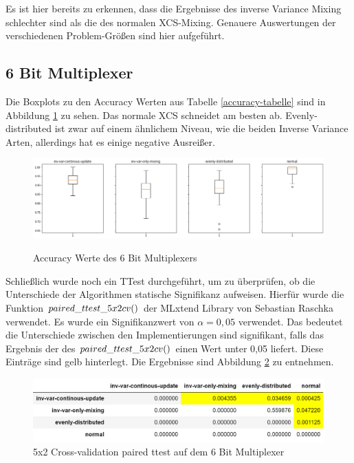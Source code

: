 \documentclass[10pt]{ocsmnar}
\begin{document}
Es ist hier bereits zu erkennen, dass die Ergebnisse des inverse Variance Mixing schlechter sind als die des normalen XCS-Mixing. 
Genauere Auswertungen der verschiedenen Problem-Größen sind hier aufgeführt. 

\subsection{6 Bit Multiplexer}
Die Boxplots zu den Accuracy Werten aus Tabelle \ref{accuracy-tabelle} sind in Abbildung \ref{boxplot-6-bit} zu sehen. Das normale XCS schneidet am besten ab. Evenly-distributed ist zwar auf einem ähnlichem Niveau, wie die beiden Inverse Variance Arten, allerdings hat es einige negative Ausreißer. 


\begin{figure}
    \includegraphics[width=\linewidth]{img/boxplot_6Bitpng.png}
    \caption{Accuracy Werte des 6 Bit Multiplexers}
    \label{boxplot-6-bit}
\end{figure}

Schließlich wurde noch ein TTest durchgeführt, um zu überprüfen, ob die Unterschiede der Algorithmen statische Signifikanz aufweisen. Hierfür wurde die Funktion $paired\_\-ttest\-\_5x2cv()$ der MLxtend Library von Sebastian Raschka verwendet. Es wurde ein Signifikanzwert von $\alpha = 0,05$ verwendet. Das bedeutet die Unterschiede zwischen den Implementierungen sind signifikant, falls das Ergebnis der des $paired\_\-ttest\-\_5x2cv()$ einen Wert unter 0,05 liefert. Diese Einträge sind gelb hinterlegt. Die Ergebnisse sind Abbildung \ref{ttest-6-bit} zu entnehmen. 

\begin{figure}
    \includegraphics[width=\linewidth]{img/ttest_6_bit.png}
    \caption{5x2 Cross-validation paired ttest auf dem 6 Bit Multiplexer}\label{ttest-6-bit}
\end{figure}
\end{document}
